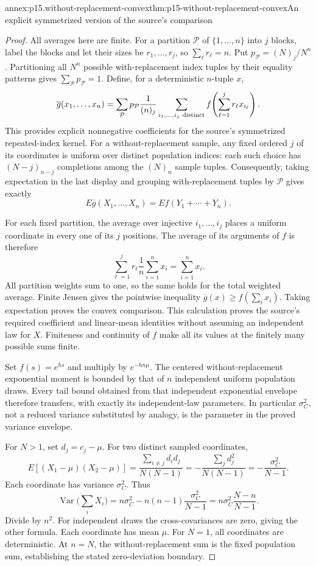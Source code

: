 \begin{annexitem}{annex:p15.without-replacement-convex}{thm:p15-without-replacement-convex}{An explicit symmetrized version of the source's comparison}
\begin{proof}
All averages here are finite. For a partition \(\mathcal P\) of
\(\{1,\ldots,n\}\) into \(j\) blocks, label the blocks and let their
sizes be \(r_1,\ldots,r_j\), so \(\sum_\ell r_\ell=n\).
Put \(p_{\mathcal P}=(N)_j/N^n\). Partitioning all \(N^n\) possible
with-replacement index tuples by their equality patterns gives
\(\sum_{\mathcal P}p_{\mathcal P}=1\).
Define, for a deterministic \(n\)-tuple \(x\),
\[
 \overline g(x_1,\ldots,x_n)=
 \sum_{\mathcal P}p_{\mathcal P}\frac1{(n)_j}
 \sum_{i_1,\ldots,i_j\ {\rm distinct}}
 f\!\left(\sum_{\ell=1}^j r_\ell x_{i_\ell}\right).
\]
This provides explicit nonnegative coefficients for the source's
symmetrized repeated-index kernel. For a without-replacement sample,
any fixed ordered \(j\) of its coordinates is uniform over distinct
population indices: each such choice has \((N-j)_{n-j}\) completions
among the \((N)_n\) sample tuples.
Consequently, taking expectation in the last display and grouping
with-replacement tuples by \(\mathcal P\) gives exactly
\[
 E\overline g(X_1,\ldots,X_n)=E f(Y_1+\cdots+Y_n).
\]

For each fixed partition, the average over injective \(i_1,\ldots,i_j\)
places a uniform coordinate in every one of its \(j\) positions.
The average of its arguments of \(f\) is therefore
\[
 \sum_{\ell=1}^j r_\ell\frac1n\sum_{i=1}^nx_i
 =\sum_{i=1}^nx_i.
\]
All partition weights sum to one, so the same holds for the total
weighted average. Finite Jensen gives the pointwise inequality
\(\overline g(x)\geq f(\sum_i x_i)\).
Taking expectation proves the convex comparison.
This calculation proves the source's required coefficient and
linear-mean identities without assuming an independent law for \(X\).
Finiteness and continuity of \(f\) make all its values at the finitely
many possible sums finite.

Set \(f(s)=e^{hs}\) and multiply by \(e^{-hn\mu}\).
The centered without-replacement exponential moment is bounded by
that of \(n\) independent uniform population draws. Every tail
bound obtained from that independent exponential envelope therefore
transfers, with exactly its independent-law parameters.
In particular \(\sigma_C^2\), not a reduced variance substituted by
analogy, is the parameter in the proved variance envelope.

For \(N>1\), set \(d_j=c_j-\mu\). For two distinct sampled coordinates,
\[
 E[(X_1-\mu)(X_2-\mu)]
 =\frac{\sum_{i\ne j}d_id_j}{N(N-1)}
 =-\frac{\sum_jd_j^2}{N(N-1)}
 =-\frac{\sigma_C^2}{N-1}.
\]
Each coordinate has variance \(\sigma_C^2\). Thus
\[
 \operatorname{Var}\Big(\sum_iX_i\Big)
 =n\sigma_C^2-n(n-1)\frac{\sigma_C^2}{N-1}
 =n\sigma_C^2\frac{N-n}{N-1}.
\]
Divide by \(n^2\). For independent draws the cross-covariances are
zero, giving the other formula. Each coordinate has mean \(\mu\).
For \(N=1\), all coordinates are deterministic.
At \(n=N\), the without-replacement sum is the fixed population sum,
establishing the stated zero-deviation boundary.


\end{proof}
\end{annexitem}
